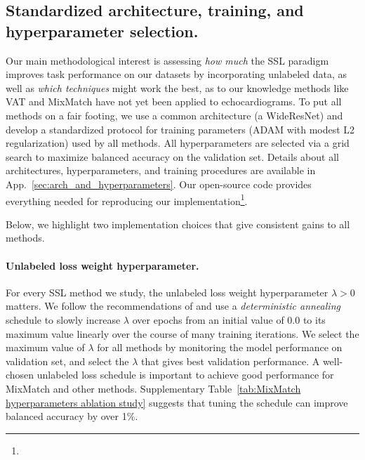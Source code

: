 \subsection{Standardized architecture, training, and hyperparameter selection.}
\label{sec:standard-SSL-framework}

Our main methodological interest is assessing \emph{how much} the SSL paradigm improves task performance on our datasets by incorporating unlabeled data, as well as \emph{which techniques} might work the best, as to our knowledge methods like VAT and MixMatch have not yet been applied to echocardiograms.
To put all methods on a fair footing, we use a common architecture (a WideResNet) and develop a standardized protocol for training parameters (ADAM with modest L2 regularization) used by all methods.
All hyperparameters are selected via a grid search to maximize balanced accuracy on the validation set.
Details about all architectures, hyperparameters, and training procedures are available in App.~\ref{sec:arch_and_hyperparameters}.
Our open-source code provides everything needed for reproducing our implementation\footnote{\codeURL}.

Below, we highlight two implementation choices that give consistent gains to all methods.

\paragraph{Unlabeled loss weight hyperparameter.}
For every SSL method we study, the unlabeled loss weight hyperparameter $\lambda > 0$ matters.
We follow the recommendations of \citet{leePseudolabelSimpleEfficient2013} and use a \emph{deterministic annealing} schedule to slowly increase $\lambda$ over epochs from an initial value of 0.0 to its maximum value linearly over the course of many training iterations. 
We select the maximum value of $\lambda$ for all methods by monitoring the model performance on validation set, and select the $\lambda$ that gives best validation performance.
A well-chosen unlabeled loss schedule is important to achieve good performance for MixMatch and other methods.
Supplementary Table~\ref{tab:MixMatch hyperparameters ablation study} suggests that tuning the schedule can improve balanced accuracy by over 1\%.


